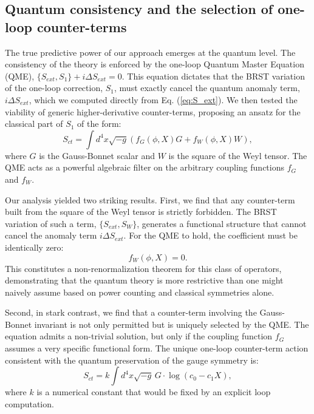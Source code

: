 \documentclass[twocolumn]{aastex631}
\begin{document}
\subsection{Quantum consistency and the selection of one-loop counter-terms}
The true predictive power of our approach emerges at the quantum level. The consistency of the theory is enforced by the one-loop Quantum Master Equation (QME), $\{S_{ext}, S_1\} + i \Delta S_{ext} = 0$. This equation dictates that the BRST variation of the one-loop correction, $S_1$, must exactly cancel the quantum anomaly term, $i\Delta S_{ext}$, which we computed directly from Eq. (\ref{eq:S_ext}). We then tested the viability of generic higher-derivative counter-terms, proposing an ansatz for the classical part of $S_1$ of the form:
\begin{equation}
    S_{ct} = \int d^4x \sqrt{-g} \left( f_G(\phi, X) G + f_W(\phi, X) W \right),
\end{equation}
where $G$ is the Gauss-Bonnet scalar and $W$ is the square of the Weyl tensor. The QME acts as a powerful algebraic filter on the arbitrary coupling functions $f_G$ and $f_W$.

Our analysis yielded two striking results. First, we find that any counter-term built from the square of the Weyl tensor is strictly forbidden. The BRST variation of such a term, $\{S_{ext}, S_{W}\}$, generates a functional structure that cannot cancel the anomaly term $i\Delta S_{ext}$. For the QME to hold, the coefficient must be identically zero:
\begin{equation}
    f_W(\phi, X) = 0.
\end{equation}
This constitutes a non-renormalization theorem for this class of operators, demonstrating that the quantum theory is more restrictive than one might naively assume based on power counting and classical symmetries alone.

Second, in stark contrast, we find that a counter-term involving the Gauss-Bonnet invariant is not only permitted but is uniquely selected by the QME. The equation admits a non-trivial solution, but only if the coupling function $f_G$ assumes a very specific functional form. The unique one-loop counter-term action consistent with the quantum preservation of the gauge symmetry is:
\begin{equation}
    S_{ct} = k \int d^4x \sqrt{-g} \, G \cdot \log(c_0 - c_1 X),
    \label{eq:counterterm}
\end{equation}
where $k$ is a numerical constant that would be fixed by an explicit loop computation.
\end{document}
